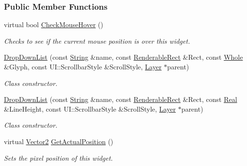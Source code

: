 \subsubsection*{Public Member Functions}
\begin{DoxyCompactItemize}
\item 
virtual bool \hyperlink{classphys_1_1UI_1_1DropDownList_a2ac515cb3282a0f190d002417e509424}{CheckMouseHover} ()
\begin{DoxyCompactList}\small\item\em Checks to see if the current mouse position is over this widget. \item\end{DoxyCompactList}\item 
\hyperlink{classphys_1_1UI_1_1DropDownList_a9868ebcc629cf6b43a3913be5358e0b8}{DropDownList} (const \hyperlink{namespacephys_aa03900411993de7fbfec4789bc1d392e}{String} \&name, const \hyperlink{structphys_1_1UI_1_1RenderableRect}{RenderableRect} \&Rect, const \hyperlink{namespacephys_a460f6bc24c8dd347b05e0366ae34f34a}{Whole} \&Glyph, const UI::ScrollbarStyle \&ScrollStyle, \hyperlink{classphys_1_1UI_1_1Layer}{Layer} $\ast$parent)
\begin{DoxyCompactList}\small\item\em Class constructor. \item\end{DoxyCompactList}\item 
\hyperlink{classphys_1_1UI_1_1DropDownList_a4646bc366b489a131747ea01629af428}{DropDownList} (const \hyperlink{namespacephys_aa03900411993de7fbfec4789bc1d392e}{String} \&name, const \hyperlink{structphys_1_1UI_1_1RenderableRect}{RenderableRect} \&Rect, const \hyperlink{namespacephys_af7eb897198d265b8e868f45240230d5f}{Real} \&LineHeight, const UI::ScrollbarStyle \&ScrollStyle, \hyperlink{classphys_1_1UI_1_1Layer}{Layer} $\ast$parent)
\begin{DoxyCompactList}\small\item\em Class constructor. \item\end{DoxyCompactList}\item 
virtual \hyperlink{classphys_1_1Vector2}{Vector2} \hyperlink{classphys_1_1UI_1_1DropDownList_a2c3b3dc073aebecd9216fa48e7cc10f2}{GetActualPosition} ()
\begin{DoxyCompactList}\small\item\em Sets the pixel position of this widget. \item\end{DoxyCompactList}\item 

\end{DoxyCompactItemize}
